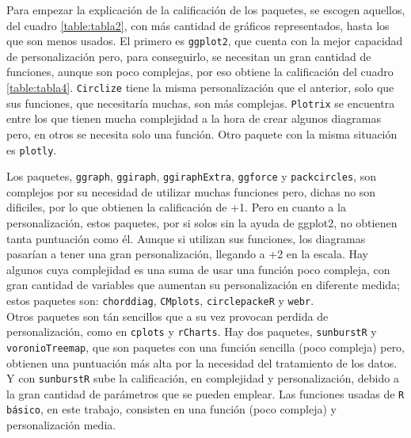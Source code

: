 \documentclass{article}\usepackage[]{graphicx}\usepackage[]{color}
\begin{document}
Para empezar la explicaci\'on de la calificaci\'on de los paquetes, se escogen aquellos, del cuadro \ref{table:tabla2}, con m\'as cantidad de gr\'aficos representados, hasta los que son menos usados. El primero es \texttt{ggplot2}, que cuenta con la mejor capacidad de personalizaci\'on pero, para conseguirlo, se necesitan un gran cantidad de funciones, aunque son poco complejas, por eso obtiene la calificaci\'on del cuadro \ref{table:tabla4}. \texttt{Circlize} tiene la misma personalizaci\'on que el anterior, solo que sus funciones, que necesitar\'ia muchas, son m\'as complejas.
\texttt{Plotrix} se encuentra entre los que tienen mucha complejidad a la hora de crear algunos diagramas pero, en otros se necesita solo una funci\'on. Otro paquete con la misma situaci\'on es \texttt{plotly}.\par
Los paquetes, \texttt{ggraph}, \texttt{ggiraph}, \texttt{ggiraphExtra}, \texttt{ggforce} y \texttt{packcircles}, son complejos por su necesidad de utilizar muchas funciones pero, dichas no son dificiles, por lo que obtienen la calificaci\'on de +1. Pero en cuanto a la personalizaci\'on, estos paquetes, por si solos sin la ayuda de ggplot2, no obtienen tanta puntuaci\'on como \'el. Aunque si utilizan sus funciones, los diagramas pasar\'ian a tener una gran personalizaci\'on, llegando a +2 en la escala.
Hay algunos cuya complejidad es una suma de usar una funci\'on poco compleja, con gran cantidad de variables que aumentan su personalizaci\'on en diferente medida; estos paquetes son: \texttt{chorddiag}, \texttt{CMplots}, \texttt{circlepackeR} y \texttt{webr}.~\\
Otros paquetes son t\'an sencillos que a su vez provocan perdida de personalizaci\'on, como en \texttt{cplots} y \texttt{rCharts}.
Hay dos paquetes, \texttt{sunburstR} y \texttt{voronioTreemap}, que son paquetes con una funci\'on sencilla (poco compleja) pero, obtienen una puntuaci\'on m\'as alta por la necesidad del tratamiento de los datos. Y con \texttt{sunburstR} sube la calificaci\'on, en complejidad y personalizaci\'on, debido a la gran cantidad de par\'ametros que se pueden emplear.
Las funciones usadas de \texttt{R b\'asico}, en este trabajo, consisten en una funci\'on (poco compleja) y personalizaci\'on media.
\clearpage
\end{document}
